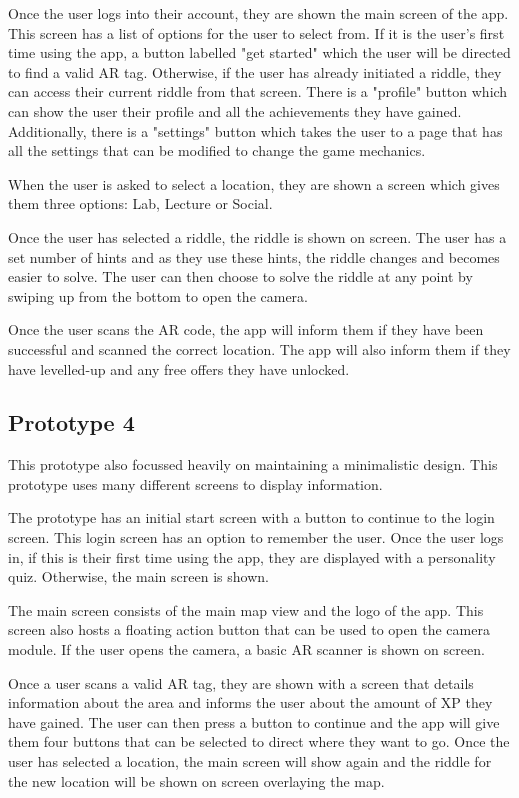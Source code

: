 \documentclass[10pt,twocolumn]{article} %
\begin{document}
Once the user logs into their account, they are shown the main screen of the app. This screen has a list of options for the user to select from. If it is the user's first time using the app, a button labelled "get started" which the user will be directed to find a valid AR tag. Otherwise, if the user has already initiated a riddle, they can access their current riddle from that screen. There is a "profile" button which can show the user their profile and all the achievements they have gained. Additionally, there is a "settings" button which takes the user to a page that has all the settings that can be modified to change the game mechanics.

When the user is asked to select a location, they are shown a screen which gives them three options: Lab, Lecture or Social.

Once the user has selected a riddle, the riddle is shown on screen. The user has a set number of hints and as they use these hints, the riddle changes and becomes easier to solve. The user can then choose to solve the riddle at any point by swiping up from the bottom to open the camera. 

Once the user scans the AR code, the app will inform them if they have been successful and scanned the correct location. The app will also inform them if they have levelled-up and any free offers they have unlocked.

\subsection*{Prototype 4}
This prototype also focussed heavily on maintaining a minimalistic design. This prototype uses many different screens to display information. 

The prototype has an initial start screen with a button to continue to the login screen. This login screen has an option to remember the user. Once the user logs in, if this is their first time using the app, they are displayed with a personality quiz. Otherwise, the main screen is shown.

The main screen consists of the main map view and the logo of the app. This screen also hosts a floating action button that can be used to open the camera module. If the user opens the camera, a basic AR scanner is shown on screen. 

Once a user scans a valid AR tag, they are shown with a screen that details information about the area and informs the user about the amount of XP they have gained. The user can then press a button to continue and the app will give them four buttons that can be selected to direct where they want to go. Once the user has selected a location, the main screen will show again and the riddle for the new location will be shown on screen overlaying the map.
\end{document}
